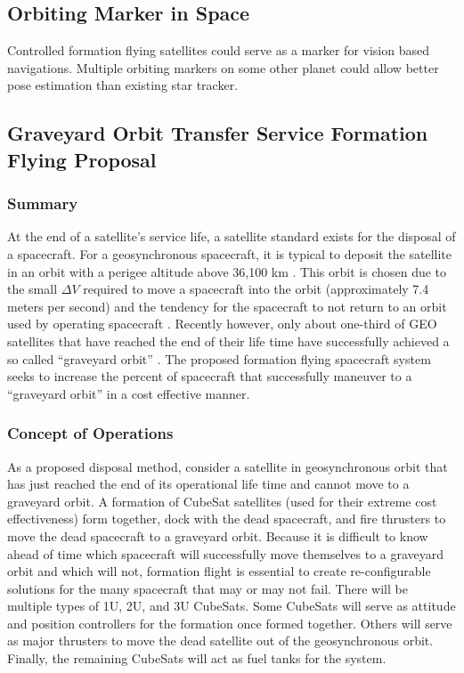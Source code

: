 \subsection{Orbiting Marker in Space}
Controlled formation flying satellites could serve as a marker for vision based navigations. Multiple orbiting markers on some other planet could allow better pose estimation than existing star tracker.

\subsection{Graveyard Orbit Transfer Service Formation Flying Proposal}
\subsubsection{Summary}
At the end of a satellite's service life, a satellite standard exists for the disposal of a spacecraft. For a geosynchronous spacecraft, it is typical to deposit the satellite in an orbit with a perigee altitude above 36,100 km \cite{standard}. This orbit is chosen due to the small $\Delta V$ required to move a spacecraft into the orbit (approximately 7.4 meters per second) and the tendency for the spacecraft to not return to an orbit used by operating spacecraft \cite {SMAD}. Recently however, only about one-third of GEO satellites that have reached the end of their life time have successfully achieved a so called ``graveyard orbit'' \cite{ESA}. The proposed formation flying spacecraft system seeks to increase the percent of spacecraft that successfully maneuver to a ``graveyard orbit'' in a cost effective manner. 

\subsubsection{Concept of Operations}
As a proposed disposal method, consider a satellite in geosynchronous orbit that has just reached the end of its operational life time and cannot move to a graveyard orbit. A formation of CubeSat satellites (used for their extreme cost effectiveness) form together, dock with the dead spacecraft, and fire thrusters to move the dead spacecraft to a graveyard orbit. Because it is difficult to know ahead of time which spacecraft will successfully move themselves to a graveyard orbit and which will not, formation flight is essential to create re-configurable solutions for the many spacecraft that may or may not fail. There will be multiple types of 1U, 2U, and 3U CubeSats. Some CubeSats will serve as attitude and position controllers for the formation once formed together. Others will serve as major thrusters to move the dead satellite out of the geosynchronous orbit. Finally, the remaining CubeSats will act as fuel tanks for the system.

